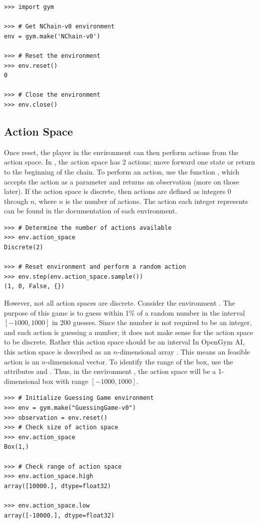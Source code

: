 \begin{lstlisting}
>>> import gym

>>> # Get NChain-v0 environment
env = gym.make('NChain-v0')

>>> # Reset the environment
>>> env.reset()
0

>>> # Close the environment
>>> env.close()
\end{lstlisting}

\subsection*{Action Space}
Once reset, the player in the environment can then perform actions from the action space.
In , the action space has 2 actions; move forward one state or return to the beginning of the chain.
To perform an action, use the function , which accepts the action as a parameter and returns an observation (more on those later).
If the action space is discrete, then actions are defined as integers 0 through $n$, where $n$ is the number of actions.
The action each integer represents can be found in the documentation of each environment.

\begin{lstlisting}
>>> # Determine the number of actions available
>>> env.action_space
Discrete(2)

>>> # Reset environment and perform a random action
>>> env.step(env.action_space.sample())
(1, 0, False, {})
\end{lstlisting}

However, not all action spaces are discrete.
Consider the environment .
The purpose of this game is to guess within 1\% of a random number in the interval $[-1000,1000]$ in 200 guesses.
Since the number is not required to be an integer, and each action is guessing a number, it does not make sense for the action space to be discrete.
Rather this action space should be an interval
In OpenGym AI, this action space is described as an $n$-dimensional array .
This means an feasible action is an $n$-dimensional vector.
To identify the range of the box, use the attributes  and .
Thus, in the environment , the action space will be a 1-dimensional box with range $[-1000,1000]$.

\begin{lstlisting}
>>> # Initialize Guessing Game environment
>>> env = gym.make("GuessingGame-v0")
>>> observation = env.reset()
>>> # Check size of action space
>>> env.action_space
Box(1,)

>>> # Check range of action space
>>> env.action_space.high
array([10000.], dtype=float32)

>>> env.action_space.low
array([-10000.], dtype=float32)
\end{lstlisting}

